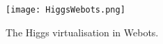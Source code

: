  
\begin{figure}[htdp]
\begin{center}
 {\texttt{[image: HiggsWebots.png]}}
\end{center}
\caption{The Higgs virtualisation in Webots.}
\label{fig:HiggsWebots}
\end{figure}